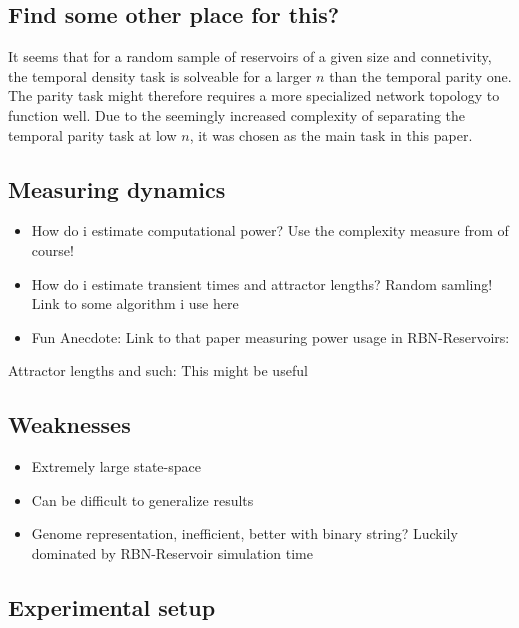 \subsection{Find some other place for this?}

It seems that for a random sample of reservoirs of a given size and connetivity,
the temporal density task is solveable for a larger $ n $ than the temporal parity one.
The parity task might therefore requires a more specialized network topology to function well.
Due to the seemingly increased complexity of separating the temporal parity task at low $ n $,
it was chosen as the main task in this paper.

\subsection{Measuring dynamics}

\begin{itemize}
  \item
    How do i estimate computational power?
    Use the complexity measure from \cite{rbn-reservoir} of course!
  \item
    How do i estimate transient times and attractor lengths?
    Random samling! Link to some algorithm i use here
  \item
    Fun Anecdote: Link to that paper measuring power usage in RBN-Reservoirs:
    \cite{rbn-reservoir-energy-efficiency}
\end{itemize}

Attractor lengths and such: This might be useful \cite{berdahl2009random}


\subsection{Weaknesses}

\begin{itemize}
  \item Extremely large state-space
  \item Can be difficult to generalize results
  \item
    Genome representation, inefficient, better with binary string?
    Luckily dominated by RBN-Reservoir simulation time
\end{itemize}


\subsection{Experimental setup}

